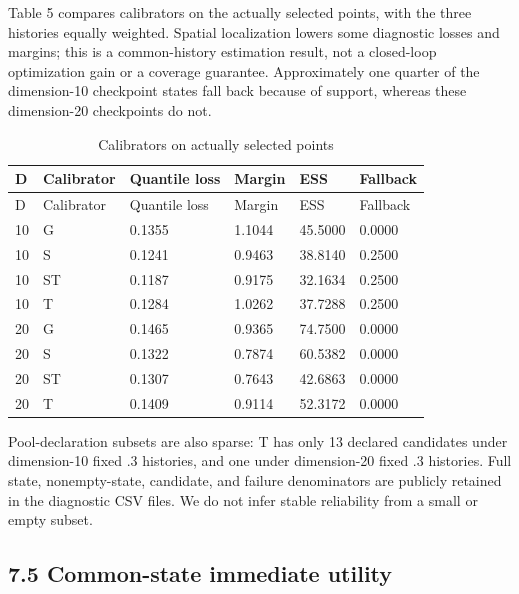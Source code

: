 \documentclass[11pt,a4paper]{article}
\begin{document}
Table 5 compares calibrators on the actually selected points, with the
three histories equally weighted. Spatial localization lowers some
diagnostic losses and margins; this is a common-history estimation
result, not a closed-loop optimization gain or a coverage guarantee.
Approximately one quarter of the dimension-10 checkpoint states fall
back because of support, whereas these dimension-20 checkpoints do not.

\par\noindent\begin{minipage}{\linewidth}

\begin{longtable}[]{@{}llllll@{}}
\caption{Calibrators on actually selected points}\tabularnewline
\toprule
D & Calibrator & Quantile loss & Margin & ESS & Fallback \\
\midrule
\endfirsthead
\toprule
D & Calibrator & Quantile loss & Margin & ESS & Fallback \\
\midrule
\endhead
10 & G & 0.1355 & 1.1044 & 45.5000 & 0.0000 \\
10 & S & 0.1241 & 0.9463 & 38.8140 & 0.2500 \\
10 & ST & 0.1187 & 0.9175 & 32.1634 & 0.2500 \\
10 & T & 0.1284 & 1.0262 & 37.7288 & 0.2500 \\
20 & G & 0.1465 & 0.9365 & 74.7500 & 0.0000 \\
20 & S & 0.1322 & 0.7874 & 60.5382 & 0.0000 \\
20 & ST & 0.1307 & 0.7643 & 42.6863 & 0.0000 \\
20 & T & 0.1409 & 0.9114 & 52.3172 & 0.0000 \\
\bottomrule
\end{longtable}

\end{minipage}\par

Pool-declaration subsets are also sparse: T has only 13 declared
candidates under dimension-10 fixed .3 histories, and one under
dimension-20 fixed .3 histories. Full state, nonempty-state, candidate,
and failure denominators are publicly retained in the diagnostic CSV
files. We do not infer stable reliability from a small or empty subset.

\hypertarget{common-state-immediate-utility}{%
\subsection{7.5 Common-state immediate
utility}\label{common-state-immediate-utility}}
\end{document}
